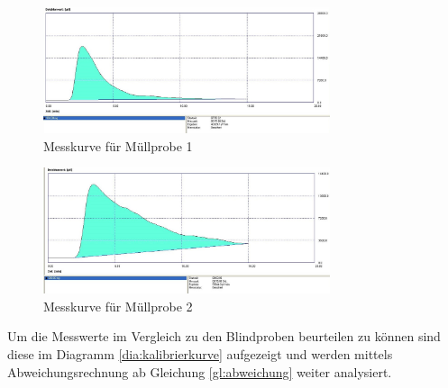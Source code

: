 \begin{figure}[h!]
	\centering
	\includegraphics[width=0.75\textwidth]{img/Muell_V1}
	\caption{Messkurve für Müllprobe 1}
	\label{dia:m1}
\end{figure}
\FloatBarrier

\begin{figure}[h!]
	\centering
	\includegraphics[width=0.75\textwidth]{img/Muell_V2}
	\caption{Messkurve für Müllprobe 2}
	\label{dia:m2}
\end{figure}
\FloatBarrier

\newpage

Um die Messwerte im Vergleich zu den Blindproben beurteilen zu können sind diese im Diagramm \ref{dia:kalibrierkurve} aufgezeigt und werden mittels Abweichungsrechnung ab Gleichung \ref{gl:abweichung} weiter analysiert.

